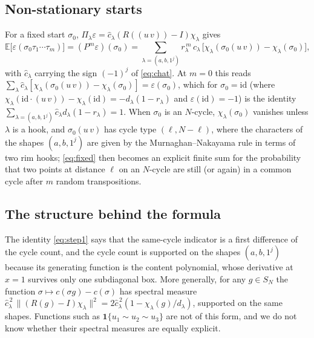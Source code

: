 \documentclass[11pt]{amsart}
\theoremstyle{remark}
\newcommand{\E}{\mathbb{E}}
\newcommand{\SN}{S_N}
\begin{document}
\subsection{Non-stationary starts}
For a fixed start $\sigma_0$, $\Pi_\lambda\varepsilon=\hat c_\lambda(R((u\,v))-I)\chi_\lambda$ gives
\begin{equation}\label{eq:fixed}
\E\bigl[\varepsilon(\sigma_0\tau_1\cdots\tau_m)\bigr]=(P^m\varepsilon)(\sigma_0)
=\sum_{\lambda=(a,b,1^j)}r_\lambda^{\,m}\,\hat c_\lambda\,\bigl[\chi_\lambda(\sigma_0(u\,v))-\chi_\lambda(\sigma_0)\bigr],
\end{equation}
with $\hat c_\lambda$ carrying the sign $(-1)^j$ of \eqref{eq:chat}.  At $m=0$ this reads $\sum_\lambda\hat c_\lambda[\chi_\lambda(\sigma_0(u\,v))-\chi_\lambda(\sigma_0)]=\varepsilon(\sigma_0)$, which for $\sigma_0=\mathrm{id}$ (where $\chi_\lambda(\mathrm{id}\cdot(u\,v))-\chi_\lambda(\mathrm{id})=-d_\lambda(1-r_\lambda)$ and $\varepsilon(\mathrm{id})=-1$) is the identity $\sum_{\lambda=(a,b,1^j)}\hat c_\lambda d_\lambda(1-r_\lambda)=1$.  When $\sigma_0$ is an $N$-cycle, $\chi_\lambda(\sigma_0)$ vanishes unless $\lambda$ is a hook, and $\sigma_0(u\,v)$ has cycle type $(\ell,N-\ell)$, where the characters of the shapes $(a,b,1^j)$ are given by the Murnaghan--Nakayama rule in terms of two rim hooks; \eqref{eq:fixed} then becomes an explicit finite sum for the probability that two points at distance $\ell$ on an $N$-cycle are still (or again) in a common cycle after $m$ random transpositions.

\subsection{The structure behind the formula}
The identity \eqref{eq:step1} says that the same-cycle indicator is a first difference of the cycle count, and the cycle count is supported on the shapes $(a,b,1^j)$ because its generating function is the content polynomial, whose derivative at $x=1$ survives only one subdiagonal box.  More generally, for any $g\in\SN$ the function $\sigma\mapsto c(\sigma g)-c(\sigma)$ has spectral measure $\hat c_\lambda^{\,2}\,\|(R(g)-I)\chi_\lambda\|^2=2\hat c_\lambda^{\,2}(1-\chi_\lambda(g)/d_\lambda)$, supported on the same shapes.  Functions such as $\mathbf 1\{u_1\sim u_2\sim u_3\}$ are not of this form, and we do not know whether their spectral measures are equally explicit.
\end{document}
